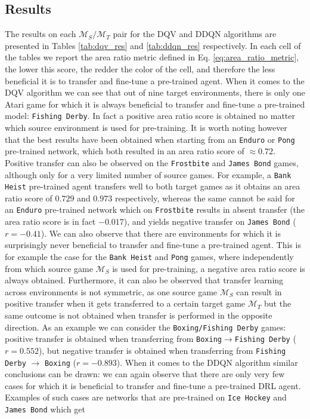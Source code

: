 \begin{figure}[ht!]
	
\label{fig:area_under_curve}
\end{figure}

\subsection{Results}
\label{sec:results_1}

The results on each $\mathcal{M}_S/\mathcal{M}_T$ pair for the DQV and DDQN algorithms are presented in Tables \ref{tab:dqv_res} and \ref{tab:ddqn_res} respectively. In each cell of the tables we report the area ratio metric defined in Eq. \ref{eq:area_ratio_metric}, the lower this score, the redder the color of the cell, and therefore the less beneficial it is to transfer and fine-tune a pre-trained agent. When it comes to the DQV algorithm we can see that out of nine target environments, there is only one Atari game for which it is always beneficial to transfer and fine-tune a pre-trained model: \texttt{Fishing Derby}. In fact a positive area ratio score is obtained no matter which source environment is used for pre-training. It is worth noting however that the best results have been obtained when starting from an \texttt{Enduro} or \texttt{Pong} pre-trained network, which both resulted in an area ratio score of $\approx 0.72$. Positive transfer can also be observed on the \texttt{Frostbite} and \texttt{James Bond} games, although only for a very limited number of source games. For example, a \texttt{Bank Heist} pre-trained agent transfers well to both target games as it obtains an area ratio score of $0.729$ and $0.973$ respectively, whereas the same cannot be said for an \texttt{Enduro} pre-trained network which on \texttt{Frostbite} results in absent transfer (the area ratio score is in fact $-0.017$), and yields negative transfer on \texttt{James Bond} ($r=-0.41$). We can also observe that there are environments for which it is surprisingly never beneficial to transfer and fine-tune a pre-trained agent. This is for example the case for the \texttt{Bank Heist} and \texttt{Pong} games, where independently from which source game $\mathcal{M}_S$ is used for pre-training, a negative area ratio score is always obtained. Furthermore, it can also be observed that transfer learning across environments is not symmetric, as one source game $\mathcal{M}_S$ can result in positive transfer when it gets transferred to a certain target game $\mathcal{M}_T$ but the same outcome is not obtained when transfer is performed in the opposite direction. As an example we can consider the \texttt{Boxing/Fishing Derby} games: positive transfer is obtained when transferring from \texttt{Boxing}$\rightarrow$\texttt{Fishing Derby} ($r=0.552$), but negative transfer is obtained when transferring from \texttt{Fishing Derby} $\rightarrow$ \texttt{Boxing} ($r=-0.893$).  When it comes to the DDQN algorithm similar conclusions can be drawn: we can again observe that there are only very few cases for which it is beneficial to transfer and fine-tune a pre-trained DRL agent. Examples of such cases are networks that are pre-trained on \texttt{Ice Hockey} and \texttt{James Bond} which get 